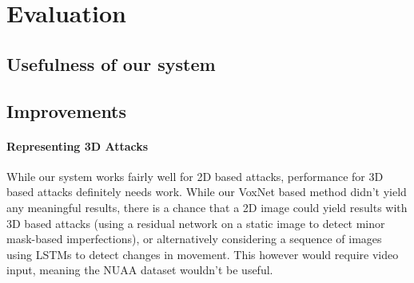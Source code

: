 \documentclass[10pt,a4paper]{article}
\begin{document}
\section{Evaluation}
    \subsection{Usefulness of our system}
    

    \subsection{Improvements}
        \paragraph{Representing 3D Attacks}
        While our system works fairly well for 2D based attacks, performance for 3D based attacks definitely needs work.
        While our VoxNet based method didn't yield any meaningful results, there is a chance that a 2D image could yield results
        with 3D based attacks (using a residual network on a static image to detect minor mask-based imperfections), or alternatively
        considering a sequence of images using LSTMs to detect changes in movement. This however would require video input, meaning the
        NUAA dataset wouldn't be useful.
\end{document}
